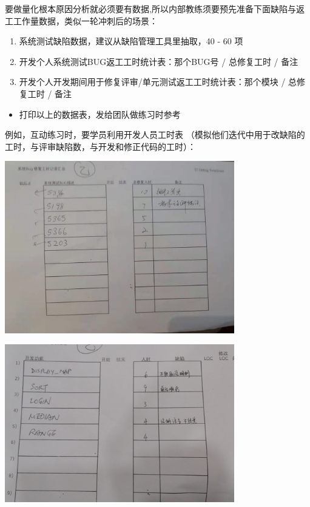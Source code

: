 要做量化根本原因分析就必须要有数据,所以内部教练须要预先准备下面缺陷与返工工作量数据，类似一轮冲刺后的场景：

\begin{enumerate}
\tightlist
\item
  系统测试缺陷数据，建议从缺陷管理工具里抽取，40 - 60 项
\item
  开发个人系统测试BUG返工工时统计表：那个BUG号 / 总修复工时 / 备注
\item
  开发个人开发期间用于修复评审/单元测试返工工时统计表：那个模块 /
  总修复工时 / 备注
\end{enumerate}

\begin{itemize}
\tightlist
\item
  打印以上的数据表，发给团队做练习时参考
\end{itemize}

例如，互动练习时，要学员利用开发人员工时表
（模拟他们迭代中用于改缺陷的工时，与评审缺陷数，与开发和修正代码的工时）：


\includegraphics[width=10cm]{缺陷表4.jpg}


\includegraphics[width=10cm]{微信截图_20211228095232.png}

